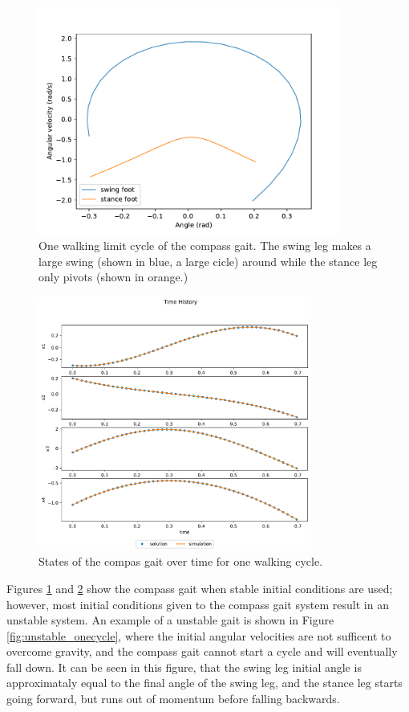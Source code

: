 \documentclass{./springer/svjour3}
\begin{document}
\begin{figure}[!h]
\centering
\includegraphics[width=10cm]{./figures/onecycle.pdf}
\caption{One walking limit cycle of the compass gait. The swing leg makes a large swing (shown in blue, a large cicle) around while the stance leg only pivots (shown in orange.)}
\label{fig:onecycle}
\end{figure}

\begin{figure}[h]
\centering
\includegraphics[width=9cm]{./figures/states_onecycle.pdf}
\caption{States of the compas gait over time for one walking cycle.}
\label{fig:states_onecycle}
\end{figure}

Figures \ref{fig:onecycle} and \ref{fig:states_onecycle} show the compass gait when stable initial conditions are used; however, most initial conditions
given to the compass gait system result in an unstable system. An example of a unstable gait is shown in Figure \ref{fig:unstable_onecycle}, where the initial angular velocities are 
not sufficent to overcome gravity, and the compass gait cannot start a cycle and will eventually fall down. It can be seen in this figure, that the swing leg initial angle 
is approximataly equal to the final angle of the swing leg, and the stance leg starts going forward, but runs out of momentum before falling backwards.
\end{document}
